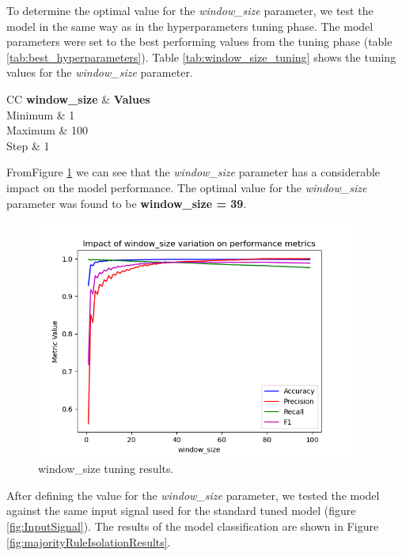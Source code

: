 \documentclass[futureinternet,article,submit,pdftex,moreauthors]{Definitions/mdpi}
\begin{document}
To determine the optimal value for the \textit{window\_size} parameter, we test the model in the same way as in the hyperparameters tuning phase. The model parameters were set to the best performing values from the tuning phase (table \ref{tab:best_hyperparameters}). Table \ref{tab:window_size_tuning} shows the tuning values for the \textit{window\_size} parameter.

\begin{table}[H]
	\caption{window\_size tuning values.}\label{tab:window_size_tuning}
	\begin{tabularx}{\textwidth}{CC}
	\toprule
	\textbf{window\_size} & \textbf{Values} \\
	\midrule
	Minimum & 1 \\
	Maximum & 100 \\
	Step & 1 \\
	\bottomrule
\end{tabularx}
\end{table}

FromFigure \ref{fig:window_size_tuning} we can see that the \textit{window\_size} parameter has a considerable impact on the model performance. The optimal value for the \textit{window\_size} parameter was found to be \textbf{window\_size = 39}.

\begin{figure}[H]
	\includegraphics[width=10.5cm]{img/WindowSizeTuning.png}
	\caption{window\_size tuning results.}\label{fig:window_size_tuning}
\end{figure}

After defining the value for the \textit{window\_size} parameter, we tested the model against the same input signal used for the standard tuned model (figure \ref{fig:InputSignal}). The results of the model classification are shown in Figure \ref{fig:majorityRuleIsolationResults}. 
\end{document}
